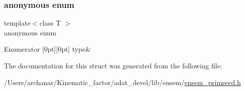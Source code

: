 \subsubsection{\texorpdfstring{anonymous enum}{anonymous enum}}
{\footnotesize\ttfamily template$<$class T $>$ \\
anonymous enum}

\begin{DoxyEnumFields}{Enumerator}
[0pt][0pt]{}\mbox{\label{structENSEM_1_1EnsbcIO_3_01PSeed_3_01T_01_4_01_4_a49f19193ce9db32abc1719c7cd9ef660a1d0ff116fce48938950c1c1cf00d6c59}} 
type&\\
\hline

\end{DoxyEnumFields}


The documentation for this struct was generated from the following file\+:\begin{DoxyCompactItemize}
\item 
/\+Users/archanar/\+Kinematic\+\_\+factor/adat\+\_\+devel/lib/ensem/\mbox{\hyperlink{lib_2ensem_2ensem__primseed_8h}{ensem\+\_\+primseed.\+h}}\end{DoxyCompactItemize}
